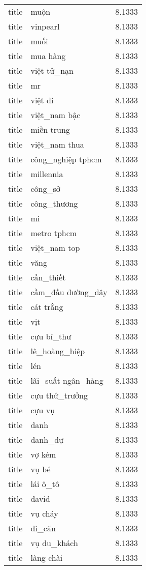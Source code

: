 \documentclass{article}
\begin{document}
\begin{tabular}{lll}
title & muộn & 8.1333\\
title & vinpearl & 8.1333\\
title & muối & 8.1333\\
title & mua hàng & 8.1333\\
title & việt tử\_nạn & 8.1333\\
title & mr & 8.1333\\
title & việt đi & 8.1333\\
title & việt\_nam bậc & 8.1333\\
title & miền trung & 8.1333\\
title & việt\_nam thua & 8.1333\\
title & công\_nghiệp tphcm & 8.1333\\
title & millennia & 8.1333\\
title & công\_sở & 8.1333\\
title & công\_thương & 8.1333\\
title & mi & 8.1333\\
title & metro tphcm & 8.1333\\
title & việt\_nam top & 8.1333\\
title & văng & 8.1333\\
title & cần\_thiết & 8.1333\\
title & cầm\_đầu đường\_dây & 8.1333\\
title & cát trắng & 8.1333\\
title & vịt & 8.1333\\
title & cựu bí\_thư & 8.1333\\
title & lê\_hoàng\_hiệp & 8.1333\\
title & lén & 8.1333\\
title & lãi\_suất ngân\_hàng & 8.1333\\
title & cựu thứ\_trưởng & 8.1333\\
title & cựu vụ & 8.1333\\
title & danh & 8.1333\\
title & danh\_dự & 8.1333\\
title & vợ kém & 8.1333\\
title & vụ bé & 8.1333\\
title & lái ô\_tô & 8.1333\\
title & david & 8.1333\\
title & vụ cháy & 8.1333\\
title & di\_căn & 8.1333\\
title & vụ du\_khách & 8.1333\\
title & làng chài & 8.1333\\

\end{tabular}
\end{document}
